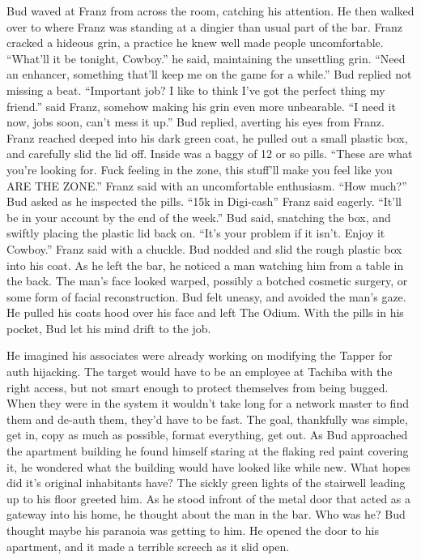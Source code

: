 \documentclass{book}
\begin{document}
Bud waved at Franz from across the room, catching his attention. He then walked over to where Franz was standing at a dingier than usual part of the bar. Franz cracked a hideous grin, a practice he knew well made people uncomfortable. ``What'll it be tonight, Cowboy.'' he said, maintaining the unsettling grin. ``Need an enhancer, something that'll keep me on the game for a while.'' Bud replied not missing a beat. ``Important job? I like to think I've got the perfect thing my friend.'' said Franz, somehow making his grin even more unbearable. ``I need it now, jobs soon, can't mess it up.'' Bud replied, averting his eyes from Franz. Franz reached deeped into his dark green coat, he pulled out a small plastic box, and carefully slid the lid off. Inside was a baggy of 12 or so pills. ``These are what you're looking for. Fuck feeling in the zone, this stuff'll make you feel like you ARE THE ZONE.'' Franz said with an uncomfortable enthusiasm. ``How much?'' Bud asked as he inspected the pills. ``15k in Digi-cash'' Franz said eagerly. ``It'll be in your account by the end of the week.'' Bud said, snatching the box, and swiftly placing the plastic lid back on. ``It's your problem if it isn't. Enjoy it Cowboy.'' Franz said with a chuckle. Bud nodded and slid the rough plastic box into his coat. As he left the bar, he noticed a man watching him from a table in the back. The man's face looked warped, possibly a botched cosmetic surgery, or some form of facial reconstruction. Bud felt uneasy, and avoided the man's gaze. He pulled his coats hood over his face and left The Odium. With the pills in his pocket, Bud let his mind drift to the job.

He imagined his associates were already working on modifying the Tapper for auth hijacking. The target would have to be an employee at Tachiba with the right access, but not smart enough to protect themselves from being bugged. When they were in the system it wouldn't take long for a network master to find them and de-auth them, they'd have to be fast. The goal, thankfully was simple, get in, copy as much as possible, format everything, get out. As Bud approached the apartment building he found himself staring at the flaking red paint covering it, he wondered what the building would have looked like while new. What hopes did it's original inhabitants have? The sickly green lights of the stairwell leading up to his floor greeted him. As he stood infront of the metal door that acted as a gateway into his home, he thought about the man in the bar. Who was he? Bud thought maybe his paranoia was getting to him. He opened the door to his apartment, and it made a terrible screech as it slid open.
\end{document}
